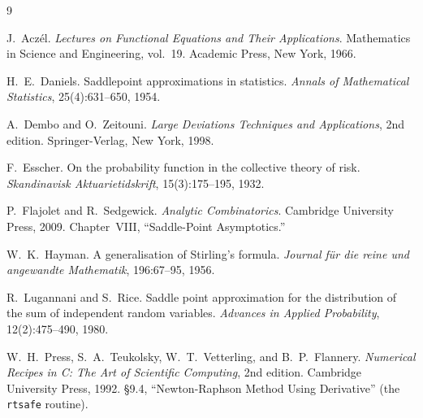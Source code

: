 \documentclass[11pt]{article}
\begin{document}
\begin{thebibliography}{9}

J.~Acz\'el.
\newblock \emph{Lectures on Functional Equations and Their Applications}.
\newblock Mathematics in Science and Engineering, vol.~19. Academic Press, New York,
1966.

H.~E.~Daniels.
\newblock Saddlepoint approximations in statistics.
\newblock \emph{Annals of Mathematical Statistics}, 25(4):631--650, 1954.

A.~Dembo and O.~Zeitouni.
\newblock \emph{Large Deviations Techniques and Applications}, 2nd edition.
\newblock Springer-Verlag, New York, 1998.

F.~Esscher.
\newblock On the probability function in the collective theory of risk.
\newblock \emph{Skandinavisk Aktuarietidskrift}, 15(3):175--195, 1932.

P.~Flajolet and R.~Sedgewick.
\newblock \emph{Analytic Combinatorics}.
\newblock Cambridge University Press, 2009. Chapter~VIII, ``Saddle-Point Asymptotics.''

W.~K.~Hayman.
\newblock A generalisation of Stirling's formula.
\newblock \emph{Journal f\"ur die reine und angewandte Mathematik}, 196:67--95, 1956.

R.~Lugannani and S.~Rice.
\newblock Saddle point approximation for the distribution of the sum of independent
random variables.
\newblock \emph{Advances in Applied Probability}, 12(2):475--490, 1980.

W.~H.~Press, S.~A.~Teukolsky, W.~T.~Vetterling, and B.~P.~Flannery.
\newblock \emph{Numerical Recipes in C: The Art of Scientific Computing}, 2nd edition.
\newblock Cambridge University Press, 1992. \S9.4, ``Newton-Raphson Method Using
Derivative'' (the \texttt{rtsafe} routine).

\end{thebibliography}
\end{document}
